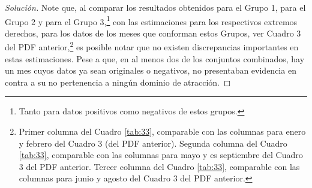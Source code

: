 \documentclass[10.5pt,notitlepage]{article}
\newenvironment{solucion}
  {\begin{proof}[Solución]}
  {\end{proof}}
\theoremstyle{plain}
\begin{document}
\begin{solucion}
Note que, al comparar los resultados obtenidos para el Grupo 1, para el Grupo 2 y para el Grupo 3,\footnote{Tanto para datos positivos como negativos de estos grupos.} con las estimaciones para los respectivos extremos derechos, para los datos de los meses que conforman estos Grupos, ver Cuadro 3 del PDF anterior,\footnote{Primer columna del Cuadro \ref{tab:33}, comparable con las columnas para enero y febrero del Cuadro 3 (del PDF anterior). Segunda columna del Cuadro \ref{tab:33}, comparable con las columnas para mayo y es septiembre del Cuadro 3 del PDF anterior. Tercer columna del Cuadro \ref{tab:33}, comparable con las columnas para junio y agosto del Cuadro 3 del PDF anterior.} es posible notar que no existen discrepancias importantes en estas estimaciones. Pese a que, en al menos dos de los conjuntos combinados, hay un mes cuyos datos ya sean originales o negativos, no presentaban evidencia en contra a su no pertenencia a ningún dominio de atracción.



\end{solucion}
\end{document}
